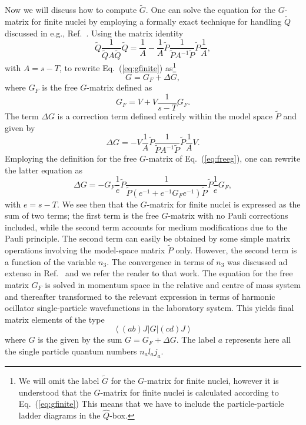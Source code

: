 \documentclass{article}
\newcommand{\bra}[1]{\left\langle #1 \right|}
\newcommand{\ket}[1]{\left| #1 \right\rangle}
\begin{document}
Now we will discuss how to compute $\tilde{G}$.
One can solve the equation for the $G$-matrix
for finite nuclei by employing
a formally
exact technique for handling $\tilde{Q}$
discussed in e.g., Ref.\ \cite{kkko76}.
Using the matrix identity
\begin{equation}
  \tilde{Q}\frac{1}{\tilde{Q}A\tilde{Q}}
  \tilde{Q}=\frac{1}{A}-
   \frac{1}{A}\tilde{P}\frac{1}{\tilde{P}A^{-1}\tilde{P}}\tilde{P}\frac{1}{A},
   \label{eq:matrix_relation_q}
\end{equation}
with $A=s -T$, to rewrite Eq.\ (\ref{eq:gfinite}) as\footnote{We will omit the
label $\tilde{G}$ for the $G$-matrix for finite nuclei, however it is
understood that the $G$-matrix for finite nuclei is calculated according
to Eq.\ (\ref{eq:gfinite}) This means that we have to
include the particle-particle ladder diagrams in the
$\hat{Q}$-box. }
\begin{equation}
   G = G_{F} +\Delta G,\label{eq:gmod}
\end{equation}
where $G_{F}$ is the free $G$-matrix defined as
\begin{equation}
   G_{F}=V+V\frac{1}{s - T}G_{F}. \label{eq:freeg}
\end{equation}
The term $\Delta G$ is a correction term defined entirely within the
model space $\tilde{P}$ and given by
\begin{equation}
   \Delta G =-V\frac{1}{A}\tilde{P}
   \frac{1}{\tilde{P}A^{-1}\tilde{P}}\tilde{P}\frac{1}{A}V.
\end{equation}
Employing the definition for the free $G$-matrix of Eq.\ (\ref{eq:freeg}),
one can rewrite the latter equation as
\begin{equation}
  \Delta G =-G_{F}\frac{1}{e}\tilde{P}
  \frac{1}{\tilde{P}(e^{-1}+e^{-1}G_{F}e^{-1})
  \tilde{P}}\tilde{P}\frac{1}{e}G_F,
\end{equation}
with $e=s -T$.
We see then that the $G$-matrix for finite nuclei
is expressed as the sum of two
terms; the first term is the free $G$-matrix with no Pauli corrections
included, while the second term accounts for medium modifications
due to the Pauli principle. The second term can easily
be obtained by some simple matrix operations involving
the model-space matrix $\tilde{P}$ only.
However, the second term is a function of the variable
$n_3$. The convergence in terms of $n_3$ was discussed ad extenso
in Ref.\ \cite{hko95} and we refer the reader to that work.
The equation for the free matrix $G_F$ is solved in momentum space in the
relative and centre of mass system and thereafter transformed to the
relevant expression in terms of harmonic ocillator single-particle
wavefunctions in the laboratory system. This yields final
matrix elements of the type
\begin{equation}
  \bra{(ab)J}G\ket{(cd)J}
\end{equation}
where $G$ is the given by the sum $G = G_{F} +\Delta G$.
The label $a$ represents here all the single particle quantum numbers
$n_{a}l_{a}j_{a}$.
\end{document}
